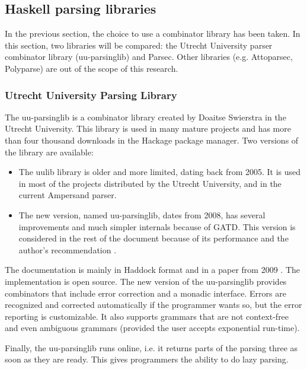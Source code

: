 
\subsection{Haskell parsing libraries}
\label{parsing:libraries}
In the previous section, the choice to use a combinator library has been taken.
In this section, two libraries will be compared: the Utrecht University parser combinator library (uu-parsinglib) and Parsec.
Other libraries (e.g. Attoparsec, Polyparse) are out of the scope of this research.

\subsubsection{Utrecht University Parsing Library}
%
%
%
The uu-parsinglib is a combinator library created by Doaitse Swierstra in the Utrecht University.
This library is used in many mature projects and has more than four thousand downloads in the Hackage package manager.
Two versions of the library are available:
\begin{itemize}
  \item The uulib library is older and more limited, dating back from 2005.
    It is used in most of the projects distributed by the Utrecht University, and in the current Ampersand parser.
  \item The new version, named uu-parsinglib, dates from 2008, has several improvements and much simpler internals because of GATD.
    This version is considered in the rest of the document because of its performance  and the author's recommendation .
\end{itemize}
%
The documentation is mainly in Haddock format and in a paper from 2009 .
The implementation is open source.
The new version of the uu-parsinglib provides combinators that include error correction and a monadic interface.
Errors are recognized and corrected automatically if the programmer wants so, but the error reporting is customizable.
It also supports grammars that are not context-free and even ambiguous grammars (provided the user accepts exponential run-time).

Finally, the uu-parsinglib runs online, i.e. it returns parts of the parsing three as soon as they are ready.
This gives programmers the ability to do lazy parsing.

